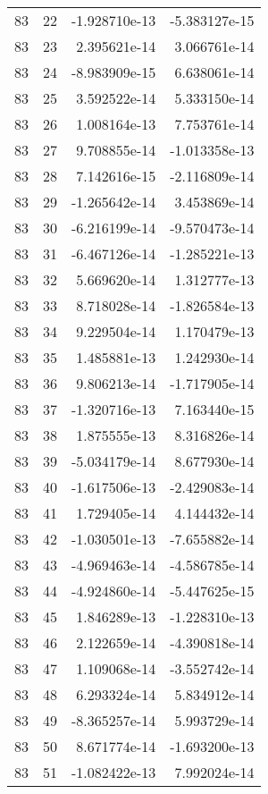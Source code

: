 \begin{tabular}{rrrr}
  83 &   22 & -1.928710e-13 & -5.383127e-15 \\
  83 &   23 &  2.395621e-14 &  3.066761e-14 \\
  83 &   24 & -8.983909e-15 &  6.638061e-14 \\
  83 &   25 &  3.592522e-14 &  5.333150e-14 \\
  83 &   26 &  1.008164e-13 &  7.753761e-14 \\
  83 &   27 &  9.708855e-14 & -1.013358e-13 \\
  83 &   28 &  7.142616e-15 & -2.116809e-14 \\
  83 &   29 & -1.265642e-14 &  3.453869e-14 \\
  83 &   30 & -6.216199e-14 & -9.570473e-14 \\
  83 &   31 & -6.467126e-14 & -1.285221e-13 \\
  83 &   32 &  5.669620e-14 &  1.312777e-13 \\
  83 &   33 &  8.718028e-14 & -1.826584e-13 \\
  83 &   34 &  9.229504e-14 &  1.170479e-13 \\
  83 &   35 &  1.485881e-13 &  1.242930e-14 \\
  83 &   36 &  9.806213e-14 & -1.717905e-14 \\
  83 &   37 & -1.320716e-13 &  7.163440e-15 \\
  83 &   38 &  1.875555e-13 &  8.316826e-14 \\
  83 &   39 & -5.034179e-14 &  8.677930e-14 \\
  83 &   40 & -1.617506e-13 & -2.429083e-14 \\
  83 &   41 &  1.729405e-14 &  4.144432e-14 \\
  83 &   42 & -1.030501e-13 & -7.655882e-14 \\
  83 &   43 & -4.969463e-14 & -4.586785e-14 \\
  83 &   44 & -4.924860e-14 & -5.447625e-15 \\
  83 &   45 &  1.846289e-13 & -1.228310e-13 \\
  83 &   46 &  2.122659e-14 & -4.390818e-14 \\
  83 &   47 &  1.109068e-14 & -3.552742e-14 \\
  83 &   48 &  6.293324e-14 &  5.834912e-14 \\
  83 &   49 & -8.365257e-14 &  5.993729e-14 \\
  83 &   50 &  8.671774e-14 & -1.693200e-13 \\
  83 &   51 & -1.082422e-13 &  7.992024e-14 \\

\end{tabular}
